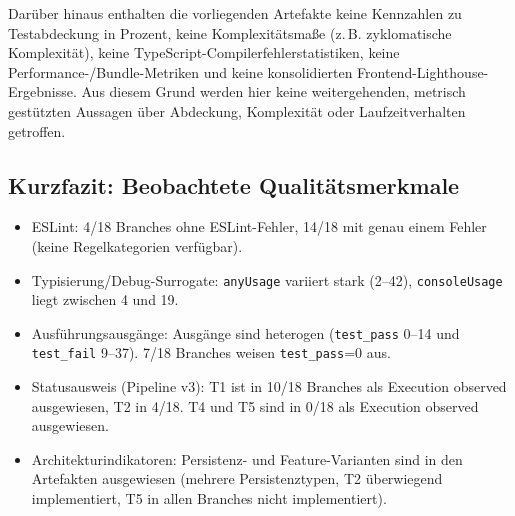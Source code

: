 Darüber hinaus enthalten die vorliegenden Artefakte keine Kennzahlen zu Testabdeckung in Prozent, keine Komplexitätsmaße (z.\,B. zyklomatische Komplexität), keine TypeScript-Compilerfehlerstatistiken, keine Performance-/Bundle-Metriken und keine konsolidierten Frontend-Lighthouse-Ergebnisse.
Aus diesem Grund werden hier keine weitergehenden, metrisch gestützten Aussagen über Abdeckung, Komplexität oder Laufzeitverhalten getroffen.

\subsection{Kurzfazit: Beobachtete Qualitätsmerkmale}
\label{sec:results_quality_summary}

\begin{itemize}
    \item ESLint: 4/18 Branches ohne ESLint-Fehler, 14/18 mit genau einem Fehler (keine Regelkategorien verfügbar).
    \item Typisierung/Debug-Surrogate: \texttt{anyUsage} variiert stark (2--42), \texttt{consoleUsage} liegt zwischen 4 und 19.
    \item Ausführungsausgänge: Ausgänge sind heterogen (\texttt{test\_pass} 0--14 und \texttt{test\_fail} 9--37). 7/18 Branches weisen \texttt{test\_pass}=0 aus.
    \item Statusausweis (Pipeline v3): T1 ist in 10/18 Branches als Execution observed ausgewiesen, T2 in 4/18. T4 und T5 sind in 0/18 als Execution observed ausgewiesen.
    \item Architekturindikatoren: Persistenz- und Feature-Varianten sind in den Artefakten ausgewiesen (mehrere Persistenztypen, T2 überwiegend implementiert, T5 in allen Branches nicht implementiert).
\end{itemize}
